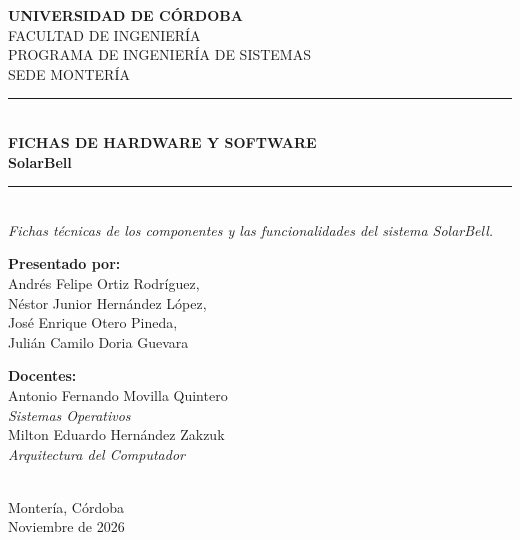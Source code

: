 \documentclass[12pt,letterpaper]{article}
\begin{document}
\begin{titlepage}
\centering
\vspace*{1cm}
{\Large \textbf{UNIVERSIDAD DE CÓRDOBA}}\\[0.3cm]
{\large FACULTAD DE INGENIERÍA}\\[0.2cm]
{\large PROGRAMA DE INGENIERÍA DE SISTEMAS}\\[0.2cm]
{\large SEDE MONTERÍA}\\[1.7cm]
\rule{\textwidth}{0.5pt}\\[0.3cm]
{\Huge \textbf{FICHAS DE HARDWARE Y SOFTWARE}}\\[0.4cm]
{\LARGE \textbf{SolarBell}}\\[0.3cm]
\rule{\textwidth}{0.5pt}\\[0.5cm]
{\large \textit{Fichas técnicas de los componentes y las funcionalidades del sistema SolarBell.}}\\[2.5cm]
\begin{minipage}[t]{0.42\textwidth}
\begin{flushleft}
\textbf{Presentado por:}\\[0.2cm]
Andrés Felipe Ortiz Rodríguez,\\
Néstor Junior Hernández López,\\
José Enrique Otero Pineda,\\
Julián Camilo Doria Guevara
\end{flushleft}
\end{minipage}\hfill
\begin{minipage}[t]{0.52\textwidth}
\begin{flushright}
\textbf{Docentes:}\\[0.2cm]
Antonio Fernando Movilla Quintero\\
\textit{Sistemas Operativos}\\[0.3cm]
Milton Eduardo Hernández Zakzuk\\
\textit{Arquitectura del Computador}
\end{flushright}
\end{minipage}\\[2.5cm]
\vfill
Montería, Córdoba\\
Noviembre de 2026
\end{titlepage}
\newpage
{}\\[0.2cm]
\end{document}
